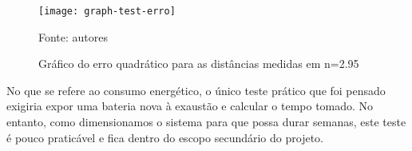 \begin{figure}[ht]
  \centering
    \caption{Gráfico do erro quadrático para as distâncias medidas em n=2.95}
    \texttt{[image: graph-test-erro]}
   \centerline{\small{Fonte: autores}}
\end{figure}

No que se refere ao consumo energético, o único teste prático que foi pensado exigiria expor uma bateria nova à exaustão e calcular o tempo tomado. No entanto, como dimensionamos o sistema para que possa durar semanas, este teste é pouco praticável e fica dentro do escopo secundário do projeto.
